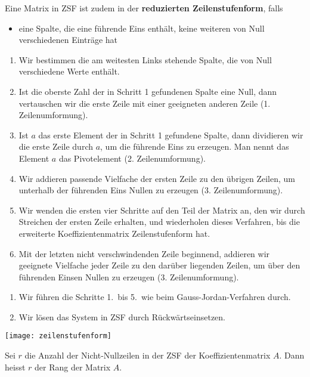 Eine Matrix in ZSF ist zudem in der \textbf{reduzierten Zeilenstufenform}, falls
\begin{itemize}
    \item eine Spalte, die eine führende Eins enthält, keine weiteren von Null verschiedenen Einträge hat
\end{itemize}


\begin{enumerate}
    \item Wir bestimmen die am weitesten Links stehende Spalte, die von Null verschiedene Werte enthält.
    \item Ist die oberste Zahl der in Schritt 1 gefundenen Spalte eine Null, dann vertauschen wir die erste Zeile mit einer geeigneten anderen Zeile (1. Zeilenumformung).
    \item Ist $a$ das erste Element der in Schritt 1 gefundene Spalte, dann dividieren wir die erste Zeile durch $a$, um die führende Eins zu erzeugen.
    Man nennt das Element $a$ das Pivotelement (2. Zeilenumformung).
    \item Wir addieren passende Vielfache der ersten Zeile zu den übrigen Zeilen, um unterhalb der führenden Eins Nullen zu erzeugen (3. Zeilenumformung).
    \item Wir wenden die ersten vier Schritte auf den Teil der Matrix an, den wir durch Streichen der ersten Zeile erhalten, und wiederholen dieses Verfahren, bis die erweiterte Koeffizientenmatrix Zeilenstufenform hat.
    \item Mit der letzten nicht verschwindenden Zeile beginnend, addieren wir geeignete Vielfache jeder Zeile zu den darüber liegenden Zeilen, um über den führenden Einsen Nullen zu
    erzeugen (3. Zeilenumformung).
\end{enumerate}


\begin{enumerate}
    \item Wir führen die Schritte 1.\ bis 5.\ wie beim Gauss-Jordan-Verfahren durch.
    \item Wir lösen das System in ZSF durch Rückwärtseinsetzen.
\end{enumerate}


\texttt{[image: zeilenstufenform]}

Sei $r$ die Anzahl der Nicht-Nullzeilen in der ZSF der Koeffizientenmatrix $A$.
Dann heisst $r$ der Rang der Matrix $A$.

